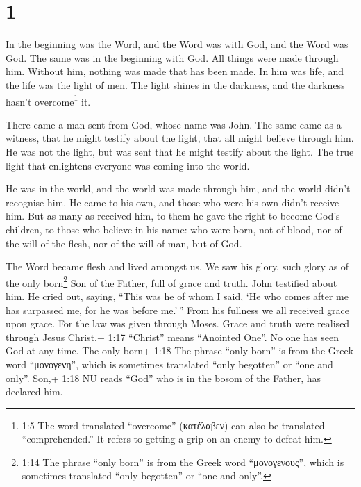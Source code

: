 \hypertarget{section}{%
\section{1}\label{section}}

 In the beginning was the Word, and the Word was with God,
and the Word was God.  The same was in the beginning with
God.  All things were made through him. Without him, nothing
was made that has been made.  In him was life, and the life
was the light of men.  The light shines in the darkness, and
the darkness hasn't overcome\footnote{1:5 The word translated
  ``overcome'' (κατέλαβεν) can also be translated ``comprehended.'' It
  refers to getting a grip on an enemy to defeat him.} it.

 There came a man sent from God, whose name was John.
 The same came as a witness, that he might testify about the
light, that all might believe through him.  He was not the
light, but was sent that he might testify about the light. 
The true light that enlightens everyone was coming into the world.

 He was in the world, and the world was made through him,
and the world didn't recognise him.  He came to his own,
and those who were his own didn't receive him.  But as many
as received him, to them he gave the right to become God's children, to
those who believe in his name:  who were born, not of
blood, nor of the will of the flesh, nor of the will of man, but of God.

 The Word became flesh and lived amongst us. We saw his
glory, such glory as of the only born\footnote{1:14 The phrase ``only
  born'' is from the Greek word ``μονογενους'', which is sometimes
  translated ``only begotten'' or ``one and only''.} Son of the Father,
full of grace and truth.  John testified about him. He
cried out, saying, ``This was he of whom I said, `He who comes after me
has surpassed me, for he was before me.'\,''  From his
fullness we all received grace upon grace.  For the law was
given through Moses. Grace and truth were realised through Jesus
Christ.+ 1:17 ``Christ'' means ``Anointed One''.  No one
has seen God at any time. The only born+ 1:18 The phrase ``only born''
is from the Greek word ``μονογενη'', which is sometimes translated
``only begotten'' or ``one and only''. Son,+ 1:18 NU reads ``God'' who
is in the bosom of the Father, has declared him.

